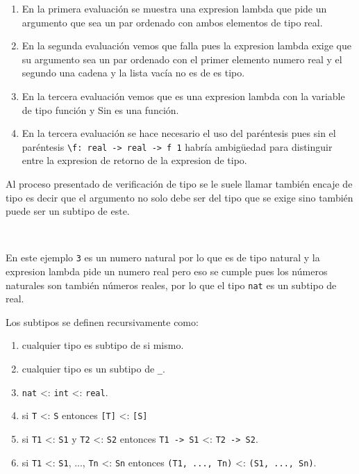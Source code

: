       \begin{enumerate}
         \item En la primera evaluación se muestra una expresion lambda que pide un argumento que sea un par ordenado con ambos elementos de tipo real.
         \item En la segunda evaluación vemos que falla pues la expresion lambda exige que su argumento sea un par ordenado con el primer elemento numero real y el segundo una cadena y la lista vacía no es de es tipo.
         \item En la tercera evaluación vemos que es una expresion lambda con la variable de tipo función y Sin es una función.
         \item En la tercera evaluación se hace necesario el uso del paréntesis pues sin el paréntesis \texttt{\textbackslash f: real ->~real ->~f 1} habría ambigüedad para distinguir entre la expresion de retorno de la expresion de tipo.
      \end{enumerate}
      
      Al proceso presentado de verificación de tipo se le suele llamar también encaje de tipo es decir que el argumento no solo debe ser del tipo que se exige sino también puede ser un subtipo de este.
      
      
      \begin{fxcode}
         \\
      \end{fxcode}
      
      En este ejemplo \texttt{3} es un numero natural por lo que es de tipo natural y la expresion lambda pide un numero real pero eso se cumple pues los números naturales son también números reales, por lo que el tipo \texttt{nat} es un subtipo de real.
      
      Los subtipos se definen recursivamente como:
      \begin{enumerate}
         \item cualquier tipo es subtipo de si mismo.
         \item cualquier tipo es un subtipo de \texttt{\_}.
         \item \texttt{nat} <: \texttt{int} <: \texttt{real}.
         \item si \texttt{T} <: \texttt{S} entonces \texttt{[T]} <: \texttt{[S]}
         \item si \texttt{T1} <: \texttt{S1} y \texttt{T2} <: \texttt{S2} entonces \texttt{T1 -> S1} <: \texttt{T2 -> S2}.
         \item si \texttt{T1} <: \texttt{S1}, ..., \texttt{Tn} <: \texttt{Sn} entonces \texttt{(T1, ..., Tn)} <: \texttt{(S1, ..., Sn)}.
      \end{enumerate}
      
